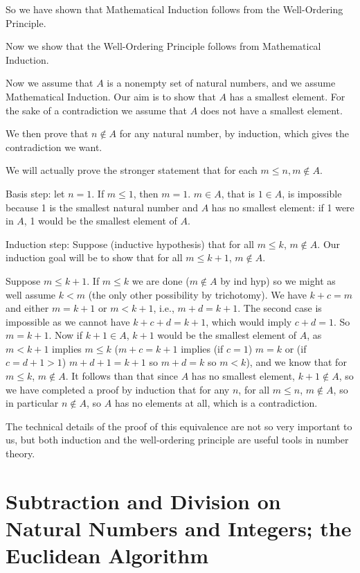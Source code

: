 \documentclass[12pt]{article}
\begin{document}
So we have shown that Mathematical Induction follows from the Well-Ordering Principle.

Now we show that the Well-Ordering Principle follows from Mathematical Induction.

Now we assume that $A$ is a nonempty set of natural numbers, and we assume Mathematical Induction.   Our aim is to show that $A$ has a smallest element.  For the sake of a contradiction we assume that $A$ does not have a smallest element. 

We then prove that $n \not\in A$ for any natural number, by induction, which gives the contradiction we want.

We will actually prove the stronger statement that for each $m \leq n, m \not\in A$.%

Basis step:  let $n=1$.  If $m \leq 1$, then $m=1$.   $m \in A$, that is $1 \in A$, is impossible because
1 is the smallest natural number and $A$ has no smallest element:  if 1 were in $A$, 1 would be the smallest element of $A$.

Induction step:  Suppose (inductive hypothesis) that for all $m \leq k$, $m \not\in A$.  Our induction goal will be to show
that for all $m \leq k+1$, $m \not\in A$.

Suppose $m \leq k+1$.   If $m \leq k$ we are done ($m \not\in A$ by ind hyp) so we might as well assume
$k<m$ (the only other possibility by trichotomy).  We have $k+c=m$ and either $m=k+1$ or $m<k+1$, i.e., $m+d=k+1$.
The second case is impossible as we cannot have $k+c+d=k+1$, which would imply $c+d=1$.  So $m=k+1$.
Now if $k+1\in A$, $k+1$ would be the smallest element of $A$, as $m<k+1$ implies $m \leq k$ ($m+c=k+1$
implies (if $c=1$) $m=k$ or (if $c=d+1>1$) $m+d+1=k+1$ so $m+d=k$ so $m < k$), and we know that for $m \leq k$, $m \not\in A$.  It follows than that since $A$ has no smallest element, $k+1 \not\in A$, so we have completed a proof by induction that for any $n$, for all $m \leq n$, $m \not\in A$, so in particular $n \not\in A$, so $A$ has no elements at all, which is a contradiction.

The technical details of the proof of this equivalence are not so very important to us, but both induction and the well-ordering principle are useful tools in number theory.

\newpage



\section{Subtraction and Division on Natural Numbers and Integers; the Euclidean Algorithm}
\end{document}
